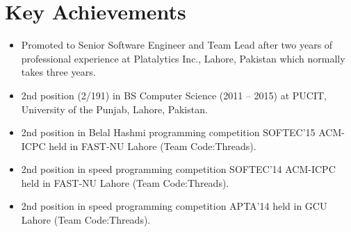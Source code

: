 \section{Key Achievements}

\begin{itemize}
    \item[\ding{118}] Promoted to Senior Software Engineer and Team Lead after two years of professional experience at Platalytics Inc., Lahore, Pakistan which normally takes three years.
    \item[\ding{118}] 2nd position (2/191) in BS Computer Science (2011 – 2015) at PUCIT, University of the Punjab, Lahore, Pakistan.
    \item[\ding{118}] 2nd position in Belal Hashmi programming competition SOFTEC’15 ACM-ICPC held in FAST-NU Lahore (Team Code:Threads).
    \item[\ding{118}] 2nd position in speed programming competition SOFTEC’14 ACM-ICPC held in FAST-NU Lahore (Team Code:Threads).
    \item[\ding{118}] 2nd position in speed programming competition APTA’14 held in GCU Lahore (Team Code:Threads).
\end{itemize}

